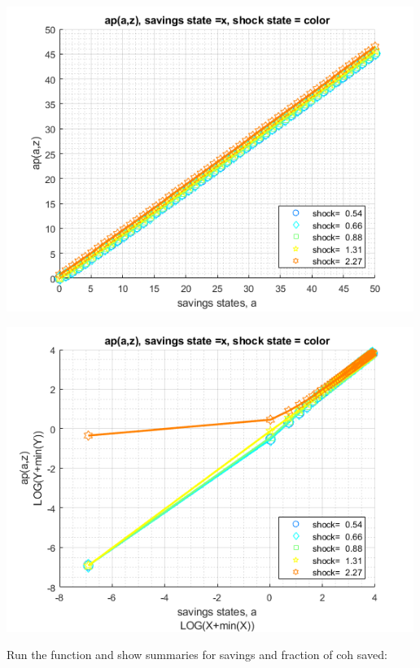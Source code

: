 \documentclass[
]{book}
\begin{document}
\includegraphics[width=5.20833in,height=\textheight]{img/fx_vfi_az_bisec_loop_images/figure_0.png}

\includegraphics[width=5.20833in,height=\textheight]{img/fx_vfi_az_bisec_loop_images/figure_1.png}

Run the function and show summaries for savings and fraction of coh
saved:
\end{document}
